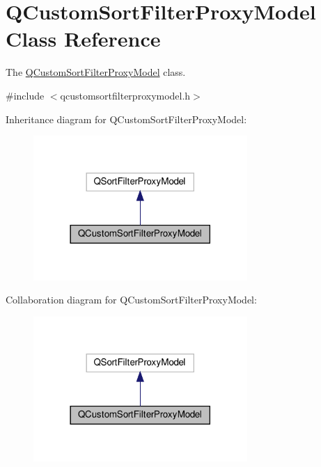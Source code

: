 \hypertarget{class_q_custom_sort_filter_proxy_model}{}\section{Q\+Custom\+Sort\+Filter\+Proxy\+Model Class Reference}
\label{class_q_custom_sort_filter_proxy_model}


The \mbox{\hyperlink{class_q_custom_sort_filter_proxy_model}{Q\+Custom\+Sort\+Filter\+Proxy\+Model}} class.  




{\ttfamily \#include $<$qcustomsortfilterproxymodel.\+h$>$}



Inheritance diagram for Q\+Custom\+Sort\+Filter\+Proxy\+Model\+:\nopagebreak
\begin{figure}[H]
\begin{center}
\leavevmode
\includegraphics[width=230pt]{class_q_custom_sort_filter_proxy_model__inherit__graph}
\end{center}
\end{figure}


Collaboration diagram for Q\+Custom\+Sort\+Filter\+Proxy\+Model\+:\nopagebreak
\begin{figure}[H]
\begin{center}
\leavevmode
\includegraphics[width=230pt]{class_q_custom_sort_filter_proxy_model__coll__graph}
\end{center}
\end{figure}

